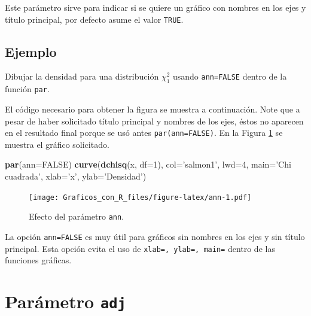 \documentclass[10pt,]{krantz}
\makeatletter
\newenvironment{Shaded}{\begin{snugshade}}{\end{snugshade}}
\newcommand{\KeywordTok}[1]{\textcolor[rgb]{0.13,0.29,0.53}{\textbf{#1}}}
\newcommand{\DataTypeTok}[1]{\textcolor[rgb]{0.13,0.29,0.53}{#1}}
\newcommand{\DecValTok}[1]{\textcolor[rgb]{0.00,0.00,0.81}{#1}}
\newcommand{\StringTok}[1]{\textcolor[rgb]{0.31,0.60,0.02}{#1}}
\newcommand{\OtherTok}[1]{\textcolor[rgb]{0.56,0.35,0.01}{#1}}
\newcommand{\NormalTok}[1]{#1}
\newenvironment{kframe}{%
\medskip{}
\setlength{\fboxsep}{.8em}
 \def\at@end@of@kframe{}%
 \ifinner\ifhmode%
  \def\at@end@of@kframe{\end{minipage}}%
  \begin{minipage}{\columnwidth}%
 \fi\fi%
 \def\FrameCommand##1{\hskip\@totalleftmargin \hskip-\fboxsep
 \colorbox{shadecolor}{##1}\hskip-\fboxsep
     \hskip-\linewidth \hskip-\@totalleftmargin \hskip\columnwidth}%
 \MakeFramed {\advance\hsize-\width
   \@totalleftmargin\z@ \linewidth\hsize
   \@setminipage}}%
 {\par\unskip\endMakeFramed%
 \at@end@of@kframe}
\renewenvironment{Shaded}{\begin{kframe}}{\end{kframe}}
\let\BeginKnitrBlock\begin \let\EndKnitrBlock\end
\makeatother
\begin{document}
Este parámetro sirve para indicar si se quiere un gráfico con nombres en
los ejes y título principal, por defecto asume el valor \texttt{TRUE}.

\subsection*{Ejemplo}\label{ejemplo-33}


Dibujar la densidad para una distribución \(\chi^2_1\) usando
\texttt{ann=FALSE} dentro de la función \texttt{par}.

El código necesario para obtener la figura se muestra a continuación.
Note que a pesar de haber solicitado título principal y nombres de los
ejes, éstos no aparecen en el resultado final porque se usó antes
\texttt{par(ann=FALSE)}. En la Figura \ref{fig:ann} se muestra el
gráfico solicitado.

\begin{Shaded}
\begin{Highlighting}[]
\KeywordTok{par}\NormalTok{(}\DataTypeTok{ann=}\OtherTok{FALSE}\NormalTok{)}
\KeywordTok{curve}\NormalTok{(}\KeywordTok{dchisq}\NormalTok{(x, }\DataTypeTok{df=}\DecValTok{1}\NormalTok{), }\DataTypeTok{col=}\StringTok{'salmon1'}\NormalTok{, }\DataTypeTok{lwd=}\DecValTok{4}\NormalTok{,}
      \DataTypeTok{main=}\StringTok{'Chi cuadrada'}\NormalTok{,}
      \DataTypeTok{xlab=}\StringTok{'x'}\NormalTok{, }\DataTypeTok{ylab=}\StringTok{'Densidad'}\NormalTok{)}
\end{Highlighting}
\end{Shaded}

\begin{figure}
\centering
\texttt{[image: Graficos\_con\_R\_files/figure-latex/ann-1.pdf]}
\caption{\label{fig:ann}Efecto del parámetro \texttt{ann}.}
\end{figure}

\BeginKnitrBlock{rmdnote}
La opción \texttt{ann=FALSE} es muy útil para gráficos sin nombres en
los ejes y sin título principal. Esta opción evita el uso de
\texttt{xlab=\textquotesingle{}\textquotesingle{},\ ylab=\textquotesingle{}\textquotesingle{},\ main=\textquotesingle{}\textquotesingle{}}
dentro de las funciones gráficas.
\EndKnitrBlock{rmdnote}

\section{\texorpdfstring{Parámetro \texttt{adj}
}{Parámetro adj  }}\label{parametro-adj}
\end{document}
